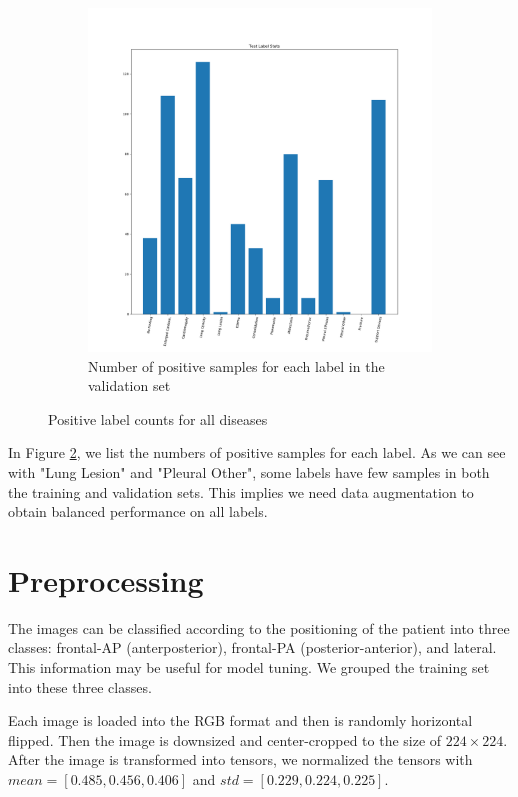 \documentclass{amia}
\begin{document}
\begin{figure}[ht]
\begin{subfigure}{0.5\linewidth}
	\includegraphics[width=\linewidth]{TestLabelStats.png}
	\caption{Number of positive samples for each label in the validation set}\label{fig:b}
\end{subfigure}
\caption{Positive label counts for all diseases}\label{label_counts}
\end{figure}

In Figure \ref{label_counts}, we list the numbers of positive samples for each label. As we can see with "Lung Lesion" and "Pleural Other", some labels have few samples in both the training and validation sets. This implies we need data augmentation to obtain balanced performance on all labels.

\section{Preprocessing}


The images can be classified according to the positioning of the patient into three classes: frontal-AP (anterposterior), frontal-PA (posterior-anterior), and lateral. This information may be useful for model tuning. We grouped the training set into these three classes. 

Each image is loaded into the RGB format and then is randomly horizontal flipped. Then the image is downsized and center-cropped to the size of $224\times224$. After the image is transformed into tensors, we normalized the tensors with $mean = [0.485, 0.456, 0.406]$ and $std = [0.229, 0.224, 0.225]$.
\end{document}
